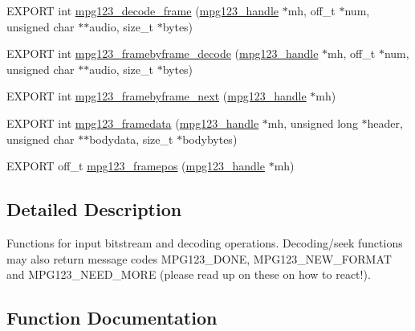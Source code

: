 \begin{DoxyCompactItemize}
\item 
E\+X\+P\+O\+RT int \hyperlink{group__mpg123__input_ga0d1d6f26298bc972669b9cc87b0db8fd}{mpg123\+\_\+decode\+\_\+frame} (\hyperlink{group__mpg123__init_ga6728e2839a395f3a07d4514da659faca}{mpg123\+\_\+handle} $\ast$mh, off\+\_\+t $\ast$num, unsigned char $\ast$$\ast$audio, size\+\_\+t $\ast$bytes)
\item 
E\+X\+P\+O\+RT int \hyperlink{group__mpg123__input_ga56bdb2367d228a0488eb58bce0d4c62b}{mpg123\+\_\+framebyframe\+\_\+decode} (\hyperlink{group__mpg123__init_ga6728e2839a395f3a07d4514da659faca}{mpg123\+\_\+handle} $\ast$mh, off\+\_\+t $\ast$num, unsigned char $\ast$$\ast$audio, size\+\_\+t $\ast$bytes)
\item 
E\+X\+P\+O\+RT int \hyperlink{group__mpg123__input_ga890d86a2d079f9d42509b92fc4788c6c}{mpg123\+\_\+framebyframe\+\_\+next} (\hyperlink{group__mpg123__init_ga6728e2839a395f3a07d4514da659faca}{mpg123\+\_\+handle} $\ast$mh)
\item 
E\+X\+P\+O\+RT int \hyperlink{group__mpg123__input_ga372652321c0daf692a82734e19926189}{mpg123\+\_\+framedata} (\hyperlink{group__mpg123__init_ga6728e2839a395f3a07d4514da659faca}{mpg123\+\_\+handle} $\ast$mh, unsigned long $\ast$header, unsigned char $\ast$$\ast$bodydata, size\+\_\+t $\ast$bodybytes)
\item 
E\+X\+P\+O\+RT off\+\_\+t \hyperlink{group__mpg123__input_gaec31482720772a7b665cc3e06167381a}{mpg123\+\_\+framepos} (\hyperlink{group__mpg123__init_ga6728e2839a395f3a07d4514da659faca}{mpg123\+\_\+handle} $\ast$mh)
\end{DoxyCompactItemize}


\subsection{Detailed Description}
Functions for input bitstream and decoding operations. Decoding/seek functions may also return message codes M\+P\+G123\+\_\+\+D\+O\+NE, M\+P\+G123\+\_\+\+N\+E\+W\+\_\+\+F\+O\+R\+M\+AT and M\+P\+G123\+\_\+\+N\+E\+E\+D\+\_\+\+M\+O\+RE (please read up on these on how to react!). 

\subsection{Function Documentation}
\mbox{\label{group__mpg123__input_ga1c86c6042807ab7734b67a829ee7a2e7}} 
